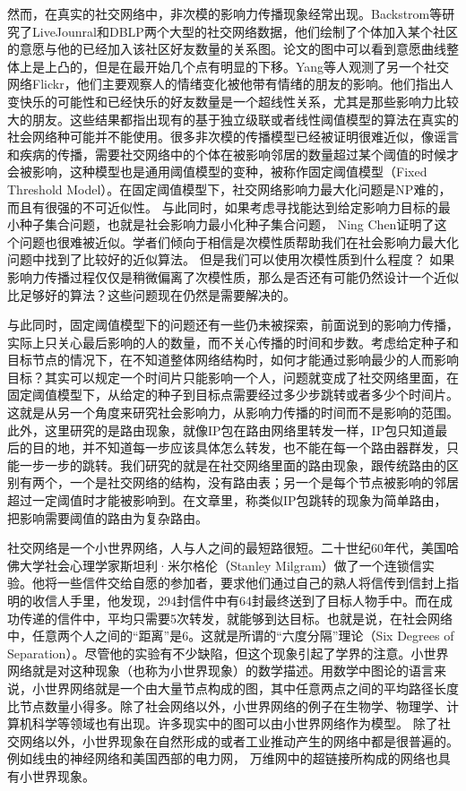 然而，在真实的社交网络中，非次模的影响力传播现象经常出现。Backstrom等\cite{backstrom2006group}研究了LiveJounral和DBLP两个大型的社交网络数据，他们绘制了个体加入某个社区的意愿与他的已经加入该社区好友数量的关系图。论文的图中可以看到意愿曲线整体上是上凸的，但是在最开始几个点有明显的下移。Yang等人\cite{yang2016role}观测了另一个社交网络Flickr，他们主要观察人的情绪变化被他带有情绪的朋友的影响。他们指出人变快乐的可能性和已经快乐的好友数量是一个超线性关系，尤其是那些影响力比较大的朋友。这些结果都指出现有的基于独立级联或者线性阈值模型的算法在真实的社会网络种可能并不能使用。很多非次模的传播模型已经被证明很难近似，像谣言和疾病的传播，需要社交网络中的个体在被影响邻居的数量超过某个阈值的时候才会被影响，这种模型也是通用阈值模型的变种，被称作固定阈值模型（Fixed Threshold Model）。在固定阈值模型下，社交网络影响力最大化问题是NP难的，而且有很强的不可近似性\cite{Kempe2003maximizing}。
与此同时，如果考虑寻找能达到给定影响力目标的最小种子集合问题，也就是社会影响力最小化种子集合问题，
Ning Chen证明了这个问题也很难被近似\cite{Chen2008approximability}。学者们倾向于相信是次模性质帮助我们在社会影响力最大化问题中找到了比较好的近似算法。
但是我们可以使用次模性质到什么程度？
如果影响力传播过程仅仅是稍微偏离了次模性质，那么是否还有可能仍然设计一个近似比足够好的算法？这些问题现在仍然是需要解决的。

与此同时，固定阈值模型下的问题还有一些仍未被探索，前面说到的影响力传播，实际上只关心最后影响的人的数量，而不关心传播的时间和步数。考虑给定种子和目标节点的情况下，在不知道整体网络结构时，如何才能通过影响最少的人而影响目标？其实可以规定一个时间片只能影响一个人，问题就变成了社交网络里面，在固定阈值模型下，从给定的种子到目标点需要经过多少步跳转或者多少个时间片。这就是从另一个角度来研究社会影响力，从影响力传播的时间而不是影响的范围。此外，这里研究的是路由现象，就像IP包在路由网络里转发一样，IP包只知道最后的目的地，并不知道每一步应该具体怎么转发，也不能在每一个路由器群发，只能一步一步的跳转。我们研究的就是在社交网络里面的路由现象，跟传统路由的区别有两个，一个是社交网络的结构，没有路由表；另一个是每个节点被影响的邻居超过一定阈值时才能被影响到。在文章里，称类似IP包跳转的现象为简单路由，把影响需要阈值的路由为复杂路由。

社交网络是一个小世界网络，人与人之间的最短路很短。二十世纪60年代，美国哈佛大学社会心理学家斯坦利·米尔格伦（Stanley Milgram）做了一个连锁信实验\cite{Milgram1967small}。他将一些信件交给自愿的参加者，要求他们通过自己的熟人将信传到信封上指明的收信人手里，他发现，294封信件中有64封最终送到了目标人物手中。而在成功传递的信件中，平均只需要5次转发，就能够到达目标。也就是说，在社会网络中，任意两个人之间的“距离”是6。这就是所谓的“六度分隔”理论（Six Degrees of Separation）。尽管他的实验有不少缺陷，但这个现象引起了学界的注意。小世界网络就是对这种现象（也称为小世界现象）的数学描述。用数学中图论的语言来说，小世界网络就是一个由大量节点构成的图，其中任意两点之间的平均路径长度比节点数量小得多。除了社会网络以外，小世界网络的例子在生物学、物理学、计算机科学等领域也有出现。许多现实中的图可以由小世界网络作为模型。
除了社交网络以外，小世界现象在自然形成的或者工业推动产生的网络中都是很普遍的。
例如线虫的神经网络和美国西部的电力网\cite{Watts1998collective}，
万维网中的超链接所构成的网络也具有小世界现象\cite{Albert1999internet}。

